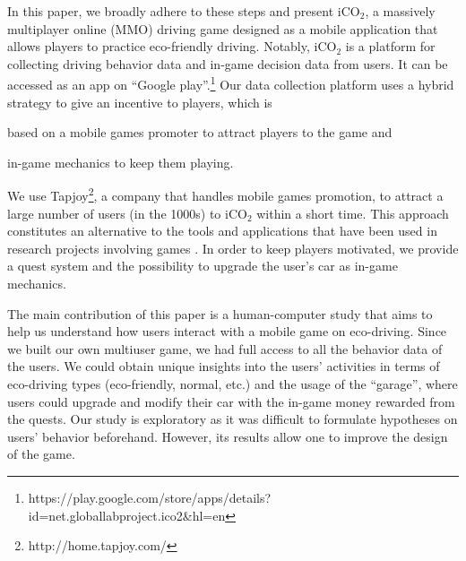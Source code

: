 \documentclass[preprint,authoryear,12pt]{elsarticle}
\begin{document}
In this paper, we broadly adhere to these steps and present iCO$_2$, a massively multiplayer online (MMO) driving game designed as a mobile application that allows players to practice eco-friendly driving. Notably, iCO$_2$ is a platform for collecting driving behavior data and in-game decision data from users. It can be accessed as an app on ``Google play''.\footnote{https://play.google.com/store/apps/details?id=net.globallabproject.ico2\&hl=en}
Our data collection platform uses a hybrid strategy to give an incentive to players, which is \begin{inparaenum} \item based on a mobile games promoter to attract players to the game and \item in-game mechanics to keep them playing. \end{inparaenum} We use Tapjoy\footnote{http://home.tapjoy.com/}, %
a company that handles mobile games promotion, to attract a large number of users (in the 1000s) to iCO$_2$ within a short time. This approach constitutes an alternative to the tools and applications that have been used in research projects involving games \citep{kittur2008crowdsourcing,Biewald:2012,ChanH12}.
In order to keep players motivated, we provide a quest system and the possibility to upgrade the user's car as in-game mechanics.

The main contribution of this paper is a human-computer study that aims to help us understand how users interact with a mobile game on eco-driving. Since we built our own multiuser game, we had full access to all the behavior data of the users. We could obtain unique insights into the users' activities in terms of eco-driving types (eco-friendly, normal, etc.) and the usage of the ``garage'', where users could upgrade and modify their car with the in-game money rewarded from the quests. Our study is exploratory as it was difficult to formulate hypotheses on users' behavior beforehand. However, its results allow one to improve the design of the game.

\end{document}
